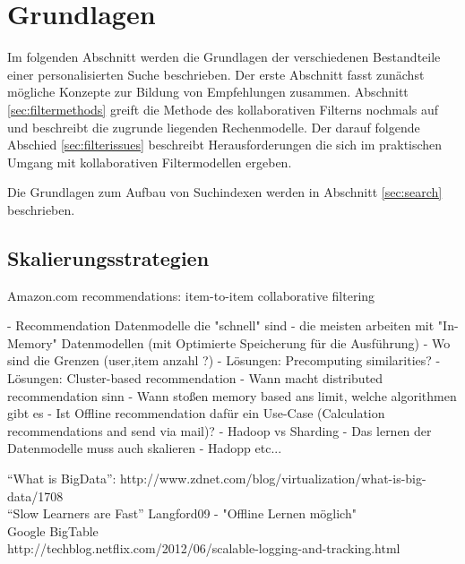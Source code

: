 \section{Grundlagen}

Im folgenden Abschnitt werden die Grundlagen der verschiedenen Bestandteile einer personalisierten Suche beschrieben. Der erste Abschnitt fasst zunächst mögliche Konzepte zur Bildung von Empfehlungen zusammen. Abschnitt \ref{sec:filtermethods} greift die Methode des kollaborativen Filterns nochmals auf und beschreibt die zugrunde liegenden Rechenmodelle. Der darauf folgende Abschied \ref{sec:filterissues} beschreibt Herausforderungen die sich im praktischen Umgang mit kollaborativen Filtermodellen ergeben. 

Die Grundlagen zum Aufbau von Suchindexen werden in Abschnitt \ref{sec:search} beschrieben.









\subsection{Skalierungsstrategien}


\citep{linden03} Amazon.com recommendations: item-to-item collaborative filtering

 - Recommendation Datenmodelle die "schnell" sind
- die meisten arbeiten mit "In-Memory" Datenmodellen (mit Optimierte Speicherung für die Ausführung)
        - Wo sind die Grenzen (user,item anzahl ?)
        - Lösungen: Precomputing similarities? 
  - Lösungen: Cluster-based recommendation
- Wann macht distributed recommendation sinn
  - Wann stoßen memory based ans limit, welche algorithmen gibt es
  - Ist Offline recommendation dafür ein Use-Case (Calculation recommendations and send via mail)?
  - Hadoop vs Sharding
  - Das lernen der Datenmodelle muss auch skalieren
- Hadopp etc...

\citep{Toscher:2008:INA:1722149.1722153}

``What is BigData'': http://www.zdnet.com/blog/virtualization/what-is-big-data/1708 \\
``Slow Learners are Fast'' Langford09 - "Offline Lernen möglich" \\
Google BigTable \\
http://techblog.netflix.com/2012/06/scalable-logging-and-tracking.html

